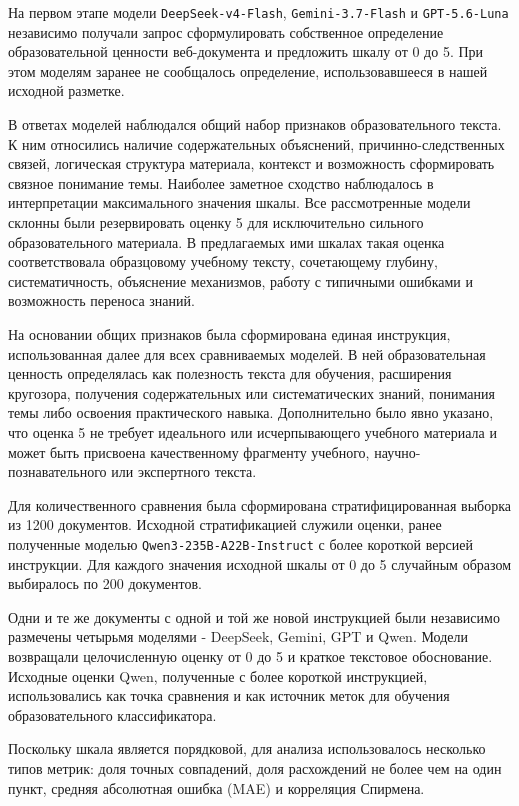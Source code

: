\documentclass[12pt,a4paper]{article}
\begin{document}
На первом этапе модели \texttt{DeepSeek-v4-Flash}, \texttt{Gemini-3.7-Flash} 
и \texttt{GPT-5.6-Luna} независимо получали запрос сформулировать собственное 
определение образовательной ценности веб-документа и предложить шкалу от 0 до 5.
При этом моделям заранее не сообщалось определение, использовавшееся в нашей исходной разметке.

В ответах моделей наблюдался общий набор признаков образовательного текста. 
К ним относились наличие содержательных объяснений, причинно-следственных связей, 
логическая структура материала, контекст и возможность сформировать связное понимание темы. 
Наиболее заметное сходство наблюдалось в интерпретации максимального значения шкалы.
Все рассмотренные модели склонны были резервировать оценку 5 для исключительно 
сильного образовательного материала. В предлагаемых ими шкалах такая оценка 
соответствовала образцовому учебному тексту, сочетающему глубину, систематичность, 
объяснение механизмов, работу с типичными ошибками и возможность переноса знаний.

На основании общих признаков была сформирована единая инструкция, использованная 
далее для всех сравниваемых моделей. В ней образовательная ценность определялась как 
полезность текста для обучения, расширения кругозора, получения содержательных 
или систематических знаний, понимания темы либо освоения практического навыка.
Дополнительно было явно указано, что оценка 5 не требует идеального или исчерпывающего 
учебного материала и может быть присвоена качественному фрагменту учебного, 
научно-познавательного или экспертного текста.

Для количественного сравнения была сформирована стратифицированная выборка из 1200 документов.
Исходной стратификацией служили оценки, ранее полученные моделью 
\texttt{Qwen3-235B-A22B-Instruct} с более короткой версией инструкции.
Для каждого значения исходной шкалы от 0 до 5 случайным образом выбиралось по 200 документов.

Одни и те же документы с одной и той же новой инструкцией были независимо размечены 
четырьмя моделями - DeepSeek, Gemini, GPT и Qwen.
Модели возвращали целочисленную оценку от 0 до 5 и краткое текстовое обоснование.
Исходные оценки Qwen, полученные с
более короткой инструкцией, использовались как точка сравнения и как источник меток
для обучения образовательного классификатора.

Поскольку шкала является порядковой, для анализа использовалось несколько типов метрик:
доля точных совпадений, доля расхождений не более чем на один пункт, 
средняя абсолютная ошибка (MAE) и корреляция Спирмена.
\end{document}

